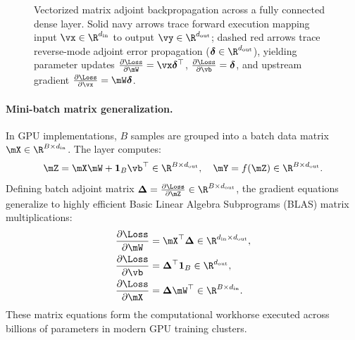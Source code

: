\documentclass[../../main.tex]{subfiles}
\begin{document}
\begin{figure}[htbp]
\caption{Vectorized matrix adjoint backpropagation across a fully connected dense layer. Solid navy arrows trace forward execution mapping input $\vx \in \R^{d_{\text{in}}}$ to output $\vy \in \R^{d_{\text{out}}}$; dashed red arrows trace reverse-mode adjoint error propagation ($\bm{\delta} \in \R^{d_{\text{out}}}$), yielding parameter updates $\frac{\partial \Loss}{\partial \mW} = \vx \bm{\delta}^\top$, $\frac{\partial \Loss}{\partial \vb} = \bm{\delta}$, and upstream gradient $\frac{\partial \Loss}{\partial \vx} = \mW \bm{\delta}$.}
\label{fig:vectorized_backprop_block}
\end{figure}

\paragraph{Mini-batch matrix generalization.}
In GPU implementations, $B$ samples are grouped into a batch data matrix $\mX \in \R^{B \times d_{\text{in}}}$. The layer computes:
\begin{equation}
\mZ = \mX \mW + \mathbf{1}_B \vb^\top \in \R^{B \times d_{\text{out}}}, \quad \mY = f(\mZ) \in \R^{B \times d_{\text{out}}}.
\end{equation}
Defining batch adjoint matrix $\bm{\Delta} = \frac{\partial \Loss}{\partial \mZ} \in \R^{B \times d_{\text{out}}}$, the gradient equations generalize to highly efficient Basic Linear Algebra Subprograms (BLAS) matrix multiplications:
\begin{align}
\frac{\partial \Loss}{\partial \mW} &= \mX^\top \bm{\Delta} \in \R^{d_{\text{in}} \times d_{\text{out}}}, \label{eq:batch_grad_W} \\
\frac{\partial \Loss}{\partial \vb} &= \bm{\Delta}^\top \mathbf{1}_B \in \R^{d_{\text{out}}}, \label{eq:batch_grad_b} \\
\frac{\partial \Loss}{\partial \mX} &= \bm{\Delta} \mW^\top \in \R^{B \times d_{\text{in}}}. \label{eq:batch_grad_X}
\end{align}
These matrix equations form the computational workhorse executed across billions of parameters in modern GPU training clusters.
\end{document}
